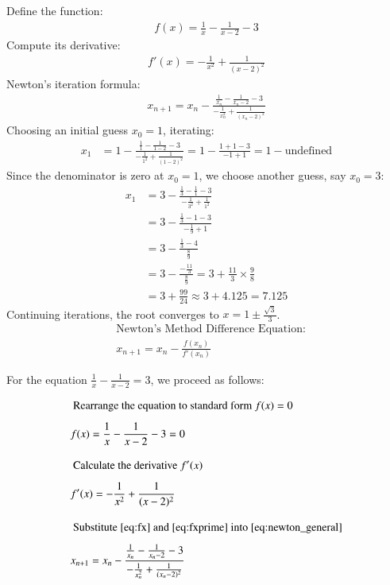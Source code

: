 \documentclass[journal]{IEEEtran}
\begin{document}
Define the function:
\begin{align}
    f(x) = \frac{1}{x} - \frac{1}{x-2} - 3
\end{align}
Compute its derivative:
\begin{align}
    f'(x) = -\frac{1}{x^2} + \frac{1}{(x-2)^2}
\end{align}
Newton's iteration formula:
\begin{align}
    x_{n+1} = x_n - \frac{\frac{1}{x_n} - \frac{1}{x_n-2} - 3}{-\frac{1}{x_n^2} + \frac{1}{(x_n-2)^2}}
\end{align}
Choosing an initial guess $x_0 = 1$, iterating:
\begin{align}
    x_1 &= 1 - \frac{\frac{1}{1} - \frac{1}{1-2} - 3}{-\frac{1}{1^2} + \frac{1}{(1-2)^2}} = 1 - \frac{1 + 1 - 3}{-1 + 1} = 1 - \text{undefined}
\end{align}
Since the denominator is zero at $x_0 = 1$, we choose another guess, say $x_0 = 3$:
\begin{align}
    x_1 &= 3 - \frac{\frac{1}{3} - \frac{1}{1} - 3}{-\frac{1}{3^2} + \frac{1}{1^2}} \\
    &= 3 - \frac{\frac{1}{3} - 1 - 3}{-\frac{1}{9} + 1} \\
    &= 3 - \frac{\frac{1}{3} - 4}{\frac{8}{9}} \\
    &= 3 - \frac{-\frac{11}{3}}{\frac{8}{9}} = 3 + \frac{11}{3} \times \frac{9}{8} \\
    &= 3 + \frac{99}{24} \approx 3 + 4.125 = 7.125
\end{align}
Continuing iterations, the root converges to $x = 1 \pm \frac{\sqrt{3}}{3}$.
\begin{align}
    &\text{Newton's Method Difference Equation:} \nonumber \\[2ex]
    &x_{n+1} = x_n - \frac{f(x_n)}{f'(x_n)} \label{eq:newton_general}
\end{align}

For the equation $\frac{1}{x} - \frac{1}{x-2} = 3$, we proceed as follows:

\begin{align}
    &\text{ Rearrange the equation to standard form } f(x) = 0 \nonumber \\[1ex]
    &f(x) = \frac{1}{x} - \frac{1}{x-2} - 3 = 0 \label{eq:fx} \\[2ex]
    &\text{ Calculate the derivative } f'(x) \nonumber \\[1ex]
    &f'(x) = -\frac{1}{x^2} + \frac{1}{(x-2)^2} \label{eq:fxprime} \\[2ex]
    &\text{ Substitute \eqref{eq:fx} and \eqref{eq:fxprime} into \eqref{eq:newton_general}} \nonumber \\[1ex]
    &x_{n+1} = x_n - \frac{\frac{1}{x_n} - \frac{1}{x_n-2} - 3}{-\frac{1}{x_n^2} + \frac{1}{(x_n-2)^2}} \label{eq:newton_specific}
\end{align}
\end{document}
